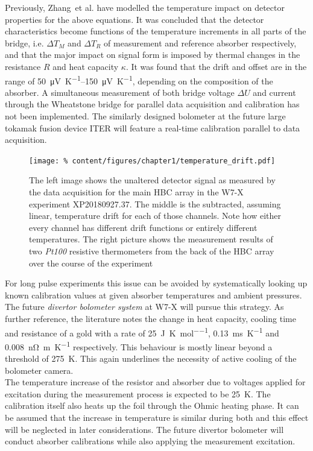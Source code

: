                 Previously, Zhang~et al. have modelled the temperature impact on detector properties for the above equations\cite{Zhang2012}. It was concluded that the detector characteristics become functions of the temperature increments in all parts of the bridge, i.e. $\Delta T_{M}$ and $\Delta T_{R}$ of measurement and reference absorber respectively, and that the major impact on signal form is imposed by thermal changes in the resistance $R$ and heat capacity $\kappa$. It was found that the drift and offset are in the range of \SIrange{50}{150}{\micro\volt\per\kelvin}, depending on the composition of the absorber\cite{Zhang2012}. A simultaneous measurement of both bridge voltage $\Delta U$ and current through the Wheatstone bridge for parallel data acquisition and calibration has not been implemented. The similarly designed bolometer at the future large tokamak fusion device ITER will feature a real-time calibration parallel to data acquisition\cite{Penzel2017}.\\%
%
                \begin{figure}[t]%
                    \centering%
                    \texttt{[image: \%
                        content/figures/chapter1/temperature\_drift.pdf]}%
                    \caption{The left image shows the unaltered detector signal as measured by the data acquisition for the main HBC array in the W7-X experiment XP20180927.37. The middle is the subtracted, assuming linear, temperature drift for each of those channels. Note how either every channel has different drift functions or entirely different temperatures. The right picture shows the measurement results of two \textit{Pt100} resistive thermometers from the back of the HBC array over the course of the experiment}\label{fig:tempdrift}%
                \end{figure}%
%
                For long pulse experiments this issue can be avoided by systematically looking up known calibration values at given absorber temperatures and ambient pressures. The future \textit{divertor bolometer system} at W7-X will pursue this strategy. As further reference, the literature notes the change in heat capacity, cooling time and resistance of a gold with a rate of \SI{25}{\joule\per\kelvin\per\mol}, \SI{0.13}{\milli\second\per\kelvin} and \SI{0.008}{\nano\ohm\meter\per\kelvin} respectively. This behaviour is mostly linear beyond a threshold of \SI{275}{\kelvin}\cite{Takahashi1986,Cutnell1998,Lloyd1998,Seitz1987,Lide1996}. This again underlines the necessity of active cooling of the bolometer camera. \\%
                The temperature increase of the resistor and absorber due to voltages applied for excitation during the measurement process is expected to be \SI{25}{\kelvin}. The calibration itself also heats up the foil through the Ohmic heating phase. It can be assumed that the increase in temperature is similar during both and this effect will be neglected in later considerations\cite{Zhang2012}. The future divertor bolometer will conduct absorber calibrations while also applying the measurement excitation.%
%
